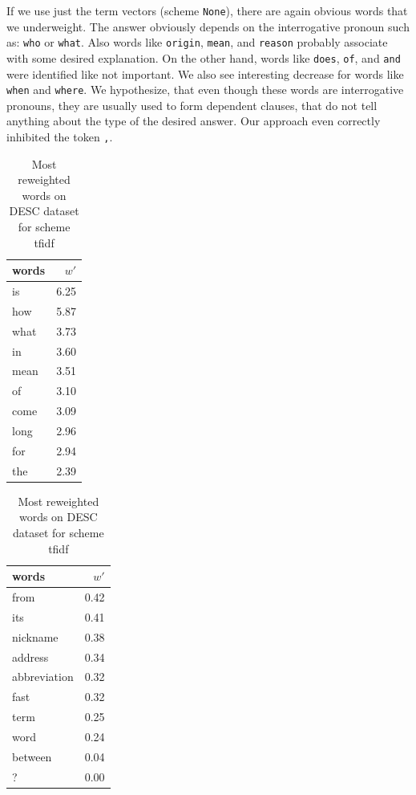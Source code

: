    If we use just the term vectors (scheme \texttt{None}), there are again obvious words that we underweight.
    The answer obviously depends on the interrogative pronoun such as: \texttt{who} or \texttt{what}.
    Also words like \texttt{origin}, \texttt{mean}, and \texttt{reason} probably associate with some desired explanation.
    On the other hand, words like \texttt{does}, \texttt{of}, and \texttt{and} were identified like not important.
    We also see interesting decrease for words like \texttt{when} and \texttt{where}.
    We hypothesize, that even though these words are interrogative pronouns, they are usually used to form dependent clauses, that do not tell anything about the type of the desired answer.
    Our approach even correctly inhibited the token \texttt{,}.
 

\begin{table}[h]
    \centering
    \begin{minipage}{.4\linewidth}
      \centering
        \begin{tabular}{lr}
\toprule
words &  $w'$ \\
\midrule
   is &  6.25 \\
  how &  5.87 \\
 what &  3.73 \\
   in &  3.60 \\
 mean &  3.51 \\
   of &  3.10 \\
 come &  3.09 \\
 long &  2.96 \\
  for &  2.94 \\
  the &  2.39 \\
\bottomrule
\end{tabular}

    \end{minipage}
    \begin{minipage}{.4\linewidth}
      \centering
        \begin{tabular}{lr}
\toprule
        words &  $w'$ \\
\midrule
         from &  0.42 \\
          its &  0.41 \\
     nickname &  0.38 \\
      address &  0.34 \\
 abbreviation &  0.32 \\
         fast &  0.32 \\
         term &  0.25 \\
         word &  0.24 \\
      between &  0.04 \\
            ? &  0.00 \\
\bottomrule
\end{tabular}

    \end{minipage} 
    \caption{Most reweighted words on DESC dataset for scheme tfidf}
    \label{tab:words:trec:tfidf}
\end{table}

